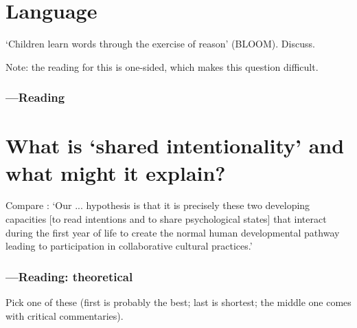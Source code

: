 \documentclass[12pt,\papersize]{extarticle}
\begin{document}
\section{Language}
‘Children learn words through the exercise of reason’ (BLOOM).  Discuss.

Note: the reading for this is one-sided, which makes this question difficult.


\subsubsection{---Reading}












\section{What is ‘shared intentionality’ and what might it explain?}

Compare \citet[p. 688]{Tomasello:2005wx}: ‘Our ... hypothesis is that it is precisely these two developing capacities [to read intentions and to share psychological states]  that interact during the first year of life to create the normal human developmental pathway leading to participation in collaborative cultural practices.’




\subsubsection{---Reading: theoretical}
Pick one of these (first is probably the best; last is shortest; the middle one comes with critical commentaries).
\end{document}

